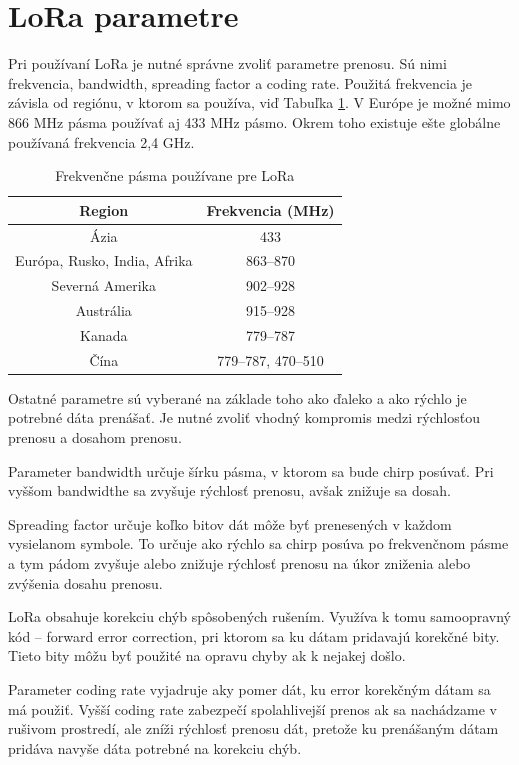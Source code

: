 \documentclass[slovak,master]{diploma}
\begin{document}
\section{LoRa parametre}
Pri používaní LoRa je nutné správne zvoliť parametre prenosu. Sú nimi frekvencia, bandwidth, spreading factor a coding rate.
Použitá frekvencia je závisla od regiónu, v ktorom sa používa, viď Tabuľka \ref{tab:ismBands}. 
V Európe je možné mimo 866 MHz pásma používať aj 433 MHz pásmo. Okrem toho existuje ešte globálne používaná frekvencia 2,4 GHz.

\begin{table}[h!]
	\centering
  \small
  \setlength\tabcolsep{6pt}
	\caption[Frekvenčne pásma používane pre LoRa]{Frekvenčne pásma používane pre LoRa}
  \begin{tabular}{c|c}
    \toprule
    Region & Frekvencia (MHz)\\
    \midrule
    Ázia & 433 \\
    Európa, Rusko, India, Afrika & 863--870 \\
    Severná Amerika & 902--928 \\
    Austrália & 915--928 \\
    Kanada & 779--787 \\
    Čína & 779--787, 470--510 \\
    \midrule
  \end{tabular}
  \label{tab:ismBands}
\end{table}


Ostatné parametre sú vyberané na základe toho ako ďaleko a ako rýchlo je potrebné dáta prenášať. Je nutné zvoliť vhodný kompromis medzi rýchlosťou prenosu 
a dosahom prenosu.

Parameter bandwidth určuje šírku pásma, v ktorom sa bude chirp posúvať. Pri vyššom bandwidthe sa zvyšuje rýchlosť prenosu, avšak znižuje sa dosah.

Spreading factor určuje koľko bitov dát môže byť prenesených v každom vysielanom symbole. To určuje ako rýchlo sa chirp posúva po frekvenčnom pásme a tym pádom 
zvyšuje alebo znižuje rýchlosť prenosu na úkor zniženia alebo zvýšenia dosahu prenosu.

LoRa obsahuje korekciu chýb spôsobených rušením. Využíva k tomu samoopravný kód -- forward error correction, pri ktorom 
sa ku dátam pridavajú korekčné bity. Tieto bity môžu byť použité na opravu chyby ak k nejakej došlo.

Parameter coding rate vyjadruje aky pomer dát, ku error korekčným dátam sa má použiť. Vyšší coding rate zabezpečí spolahlivejší prenos ak 
sa nachádzame v rušivom prostredí, ale zníži rýchlosť prenosu dát, pretože ku prenášaným dátam pridáva navyše dáta potrebné na korekciu chýb.
\end{document}
